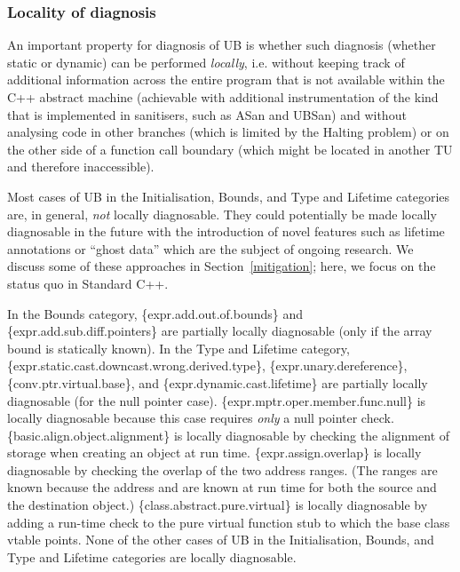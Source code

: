 \subsubsection{Locality of diagnosis}
\label{locally}

An important property for diagnosis of UB is whether such diagnosis (whether static or dynamic) can be performed \emph{locally}, i.e. without keeping track of additional information across the entire program that is not available within the C++ abstract machine (achievable with additional instrumentation of the kind that is implemented in sanitisers, such as ASan and UBSan) and without analysing code in other branches (which is limited by the Halting problem) or on the other side of a function call boundary (which might be located in another TU and therefore inaccessible).

Most cases of UB in the Initialisation, Bounds, and Type and Lifetime categories are, in general, \emph{not} locally diagnosable. They could potentially be made locally diagnosable in the future with the introduction of novel features such as lifetime annotations \cite{P2771R1} or ``ghost data'' \cite{Lippincott2025} which are the subject of ongoing research. We discuss some of these approaches in Section~\ref{mitigation}; here, we focus on the status quo in  Standard C++.

In the Bounds category, 
\{expr.add.out.of.bounds\} 
and \{expr.add.sub.diff.pointers\} 
are partially locally diagnosable (only if the array bound is statically known). In the Type and Lifetime category,
\{expr.static.cast.downcast.wrong.derived.type\},
\{expr.unary.dereference\}, 
\{conv.ptr.virtual.base\}, and
\{expr.dynamic.cast.lifetime\}
are partially locally diagnosable (for the null pointer case).
\{expr.mptr.oper.member.func.null\} is locally diagnosable because this case requires \emph{only} a null pointer check.
\{basic.align.object.alignment\} is locally diagnosable by checking the alignment of storage when creating an object at run time.
\{expr.assign.overlap\} is locally diagnosable by checking the overlap of the two address ranges. (The ranges are known because the address and  are known at run time for both the source and the destination object.) \{class.abstract.pure.virtual\} is locally diagnosable by adding a run-time check to  the pure virtual function stub to which the base class vtable points. None of the other cases of UB in the Initialisation, Bounds, and Type and Lifetime categories are locally diagnosable.

